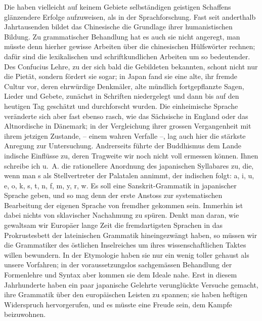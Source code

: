 \label{I.IV.japaner}
\largerpage[1]Die  haben vielleicht auf keinem Gebiete selbständigen geistigen Schaffens glänzendere Erfolge aufzuweisen, als in der Sprachforschung. Fast seit anderthalb Jahrtausenden bildet das Chinesische die Grundlage ihrer humanistischen Bildung. Zu grammatischer Behandlung hat es auch sie nicht angeregt, man müsste denn hierher gewisse Arbeiten über die chinesischen Hülfswörter rechnen; dafür sind die lexikalischen und schriftkundlichen Arbeiten um so bedeutender. Des Confucius Lehre, zu der sich bald die Gebildeten bekannten, schont nicht nur die Pietät, sondern fördert sie sogar; in Japan fand sie eine alte, ihr fremde Cultur vor, deren ehrwürdige Denkmäler, alte mündlich fortgepflanzte Sagen, Lieder und Gebete, zunächst in Schriften niedergelegt und dann bis auf den heutigen Tag geschätzt und durchforscht wurden. Die einheimische Sprache veränderte sich aber fast ebenso rasch, wie das Sächsische in England oder das Altnordische in Dänemark; in der Vergleichung ihrer grossen Vergangenheit mit ihrem jetzigen Zustande, – einem wahren Verfalle –, lag auch hier die stärkste Anregung zur Untersuchung. Andrerseits führte der Buddhismus dem Lande indische Einflüsse zu, deren Tragweite wir noch nicht voll ermessen können. Ihnen schreibe ich u.~A. die rationellere Anordnung des japanischen Syllabares zu, die, wenn man s als Stellvertreter der Palatalen annimmt, der indischen folgt: a, i, u, e, o, k, s, t, n, f, m, y, r, w. Es soll eine Sanskrit-Grammatik in japanischer Sprache geben, und so mag denn der erste Anstoss zur systematischen Bearbeitung der eigenen Sprache von \label{fp.24} fremdher gekommen sein. Immerhin ist dabei nichts von sklavischer Nachahmung zu spüren. Denkt man daran, wie gewaltsam wir Europäer lange Zeit die fremdartigsten Sprachen in das Prokrustesbett der lateinischen Grammatik hineingezwängt haben, so müssen wir die Grammatiker des östlichen Inselreiches um ihres wissenschaftlichen Taktes willen bewundern. In der Etymologie haben sie nur ein wenig toller gehaust als unsere Vorfahren; in der voraussetzungslos sachgemässen Behandlung der Formenlehre und Syntax aber kommen sie dem Ideale  nahe. Erst in diesem Jahrhunderte haben ein paar japanische Gelehrte verunglückte Versuche gemacht, ihre Grammatik über den europäischen Leisten zu spannen; sie haben heftigen Widerspruch hervorgerufen, und es müsste eine Freude sein, dem Kampfe beizuwohnen.

